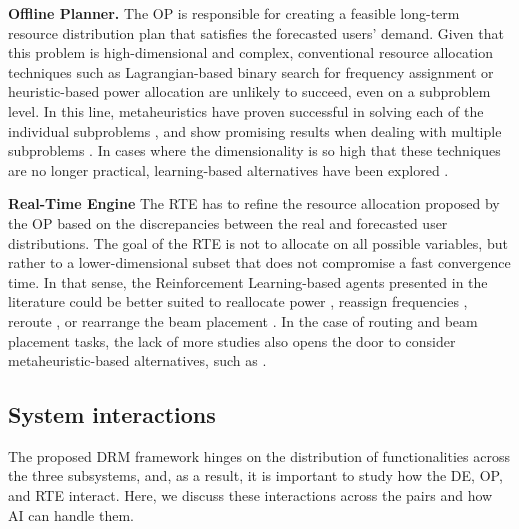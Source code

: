\documentclass[letterpaper]{article} %
\begin{document}
\textbf{Offline Planner.} The OP is responsible for creating a feasible long-term resource distribution plan that satisfies the forecasted users' demand. Given that this problem is high-dimensional and complex, conventional resource allocation techniques such as Lagrangian-based binary search for frequency assignment \cite{park2012dynamic} or heuristic-based power allocation \cite{destounis2011dynamic} are unlikely to succeed, even on a subproblem level. In this line, metaheuristics have proven successful in solving each of the individual subproblems \cite{Deng2018, rao2011performance, tirmizi2015efficient, Durand2017}, and show promising results when dealing with multiple subproblems \cite{Camino2014, pachler20b, He2017}. In cases where the dimensionality is so high that these techniques are no longer practical, learning-based alternatives have been explored \cite{hu2020dynamic, gong2020adaptive, wangdynamic, Luis2019}.


\textbf{Real-Time Engine} The RTE has to refine the resource allocation proposed by the OP based on the discrepancies between the real and forecasted user distributions. The goal of the RTE is not to allocate on all possible variables, but rather to a lower-dimensional subset that does not compromise a fast convergence time. In that sense, the Reinforcement Learning-based agents presented in the literature could be better suited to reallocate power \cite{zhang2020online, liao2020distributed, Ferreira2018, Luis2019, Luis2020}, reassign frequencies \cite{liao2020distributed, zheng2020leo, Ferreira2018, Hu2018ASystems}, reroute \cite{gong2020adaptive}, or rearrange the beam placement \cite{hu2020dynamic}. In the case of routing and beam placement tasks, the lack of more studies also opens the door to consider metaheuristic-based alternatives, such as \cite{wangdynamic, Deng2018, He2017, Anzalchi2010, Angeletti2006, rao2011performance}.

\subsection{System interactions} \label{sec:4.4}
 
The proposed DRM framework hinges on the distribution of functionalities across the three subsystems, and, as a result, it is important to study how the DE, OP, and RTE interact. Here, we discuss these interactions across the pairs and how AI can handle them.
\end{document}
